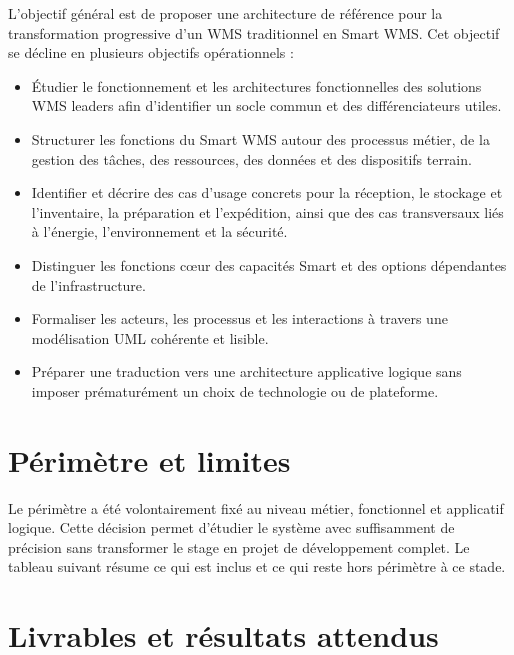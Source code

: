 \label{sec:1.7}

L’objectif général est de proposer une architecture de référence pour la transformation progressive d’un WMS traditionnel en Smart WMS. Cet objectif se décline en plusieurs objectifs opérationnels :


\begin{itemize}

\item Étudier le fonctionnement et les architectures fonctionnelles des solutions WMS leaders afin d’identifier un socle commun et des différenciateurs utiles.
\item Structurer les fonctions du Smart WMS autour des processus métier, de la gestion des tâches, des ressources, des données et des dispositifs terrain.

\item Identifier et décrire des cas d’usage concrets pour la réception, le stockage et l’inventaire, la préparation et l’expédition, ainsi que des cas transversaux liés à l’énergie, l’environnement et la sécurité.
\item Distinguer les fonctions cœur des capacités Smart et des options dépendantes de l’infrastructure.
\item Formaliser les acteurs, les processus et les interactions à travers une modélisation UML cohérente et lisible.
\item Préparer une traduction vers une architecture applicative logique sans imposer prématurément un choix de technologie ou de plateforme.

\end{itemize}


\section{Périmètre et limites}

\label{sec:1.8}

Le périmètre a été volontairement fixé au niveau métier, fonctionnel et applicatif logique. Cette décision permet d’étudier le système avec suffisamment de précision sans transformer le stage en projet de développement complet. Le tableau suivant résume ce qui est inclus et ce qui reste hors périmètre à ce stade.





\section{Livrables et résultats attendus}

